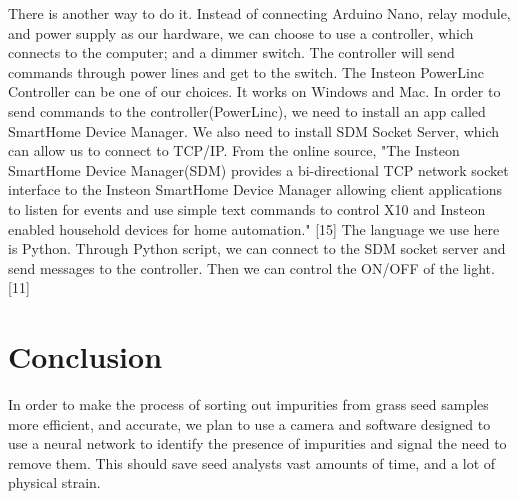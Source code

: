 \documentclass[onecolumn, draftclsnofoot,10pt, compsoc]{IEEEtran}
\begin{document}
There is another way to do it. Instead of connecting Arduino Nano, relay module, and power supply as our hardware, we can choose to use a controller, which connects to the computer; and a dimmer switch. The controller will send commands through power lines and get to the switch. The Insteon PowerLinc Controller can be one of our choices. It works on Windows and Mac. In order to send commands to the controller(PowerLinc), we need to install an app called SmartHome Device Manager. We also need to install SDM Socket Server, which can allow us to connect to TCP/IP. From the online source, "The Insteon SmartHome Device Manager(SDM) provides a bi-directional TCP network socket interface to the Insteon SmartHome Device Manager allowing client applications to listen for events and use simple text commands to control X10 and Insteon enabled household devices for home automation." [15] The language we use here is Python. Through Python script, we can connect to the SDM socket server and send messages to the controller. Then we can control the ON/OFF of the light. [11]
\pagebreak

\section{Conclusion}
In order to make the process of sorting out impurities from grass seed samples more efficient, and accurate, we plan to use a camera and software designed to use a neural network to identify the presence of impurities and signal the need to remove them. This should save seed analysts vast amounts of time, and a lot of physical strain.
\pagebreak
\end{document}
